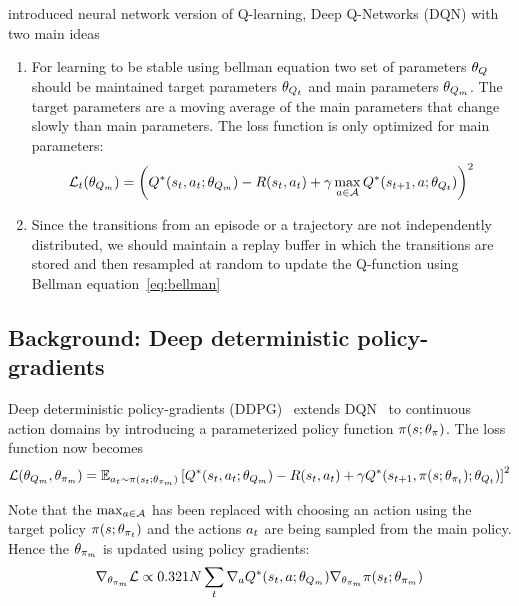 \citet{MnKaSiNATURE2015} introduced neural network version of Q-learning, Deep
Q-Networks (DQN) with
two main ideas
%
\begin{enumerate}
\item For learning to be stable using bellman equation two set of parameters
  $\theta_{Q}$ should be maintained target parameters
  $\theta_{Q_t}$ and main parameters $\theta_{Q_m}$. The
  target parameters are a moving average of the main parameters that change
  slowly than main parameters. The loss function is only optimized for main parameters:
\begin{align}
  \mathcal{L}_t(\theta_{Q_m}) = \left(
  Q^*(s_t, a_t; \theta_{Q_m}) -
  R(s_t, a_t) + \gamma \max_{a \in \mathcal{A}} Q^*(s_{t+1}, a; \theta_{Q_t}) \right)^2
                                    \label{eq:bellman-dqn}
\end{align}

\item Since the transitions from an episode or a trajectory are not
  independently distributed, we should maintain a replay buffer in which the
  transitions are stored and then resampled at random to update the Q-function
  using Bellman equation~\eqref{eq:bellman}
\end{enumerate}%
% 


\subsection{Background: Deep deterministic policy-gradients}

Deep deterministic policy-gradients (DDPG)~\citep{lillicrap2015continuous}
extends DQN~\citep{MnKaSiNATURE2015} to continuous action domains by introducing
a parameterized policy function $\pi(s; \theta_\pi)$. The loss
function now becomes
\begin{align}
  \mathcal{L}(\theta_{Q_m}, \theta_{\pi_m}) = \mathbb{E}_{a_t\sim\pi(s_t; \theta_{\pi_m})}\left[
  Q^*(s_t, a_t; \theta_{Q_m}) -
  R(s_t, a_t) + \gamma Q^*(s_{t+1}, \pi(s; \theta_{\pi_t}); \theta_{Q_t}) \right]^2 \label{eq:bellman-ddpg}
\end{align}

Note that the $\max_{a \in \mathcal{A}}$ has been replaced with choosing an action
using the target policy $\pi(s; \theta_{\pi_t})$ and the actions
$a_t$ are being sampled from the main policy. Hence the $\theta_{\pi_m}$
is updated using policy gradients:
%
\begin{align}
\nabla_{\theta_{\pi_m}} \mathcal{L} \propto 0.32{1}{N} \sum_t \nabla_a Q^*(s_t, a; \theta_{Q_m})\nabla_{\theta_{\pi_m}} \pi(s_t; \theta_{\pi_m})
\end{align}%
% 

